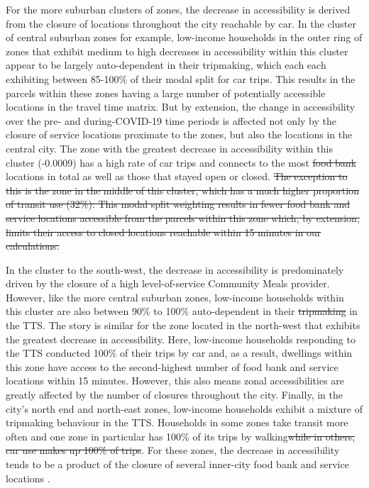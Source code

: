 \documentclass[]{elsarticle} %
\providecommand{\DIFaddtex}[1]{{\protect\color{blue}\uwave{#1}}} %
\providecommand{\DIFdeltex}[1]{{\protect\color{red}\sout{#1}}}                      %
\providecommand{\DIFaddbegin}{} %
\providecommand{\DIFaddend}{} %
\providecommand{\DIFdelbegin}{} %
\providecommand{\DIFdelend}{} %
\providecommand{\DIFadd}[1]{\texorpdfstring{\DIFaddtex{#1}}{#1}} %
\providecommand{\DIFdel}[1]{\texorpdfstring{\DIFdeltex{#1}}{}} %
\newcommand{\DIFscaledelfig}{0.5}
\newlength{\DIFdelgraphicswidth} %
\newlength{\DIFdelgraphicsheight} %
\newcommand{\DIFaddincludegraphics}[2][]{{\color{blue}\fbox{\DIFOincludegraphics[#1]{#2}}}} %
\newcommand{\DIFdelincludegraphics}[2][]{%
\sbox{\DIFdelgraphicsbox}{\DIFOincludegraphics[#1]{#2}}%
\settoboxwidth{\DIFdelgraphicswidth}{\DIFdelgraphicsbox} %
\settoboxtotalheight{\DIFdelgraphicsheight}{\DIFdelgraphicsbox} %
\scalebox{\DIFscaledelfig}{%
\parbox[b]{\DIFdelgraphicswidth}{\usebox{\DIFdelgraphicsbox}\\[-\baselineskip] \rule{\DIFdelgraphicswidth}{0em}}\llap{\resizebox{\DIFdelgraphicswidth}{\DIFdelgraphicsheight}{%
\setlength{\unitlength}{\DIFdelgraphicswidth}%
\begin{picture}(1,1)%
\thicklines\linethickness{2pt} %
{\color[rgb]{1,0,0}\put(0,0){\framebox(1,1){}}}%
{\color[rgb]{1,0,0}\put(0,0){\line( 1,1){1}}}%
{\color[rgb]{1,0,0}\put(0,1){\line(1,-1){1}}}%
\end{picture}%
}\hspace*{3pt}}} %
} %
\DeclareRobustCommand{\DIFaddbegin}{\DIFOaddbegin \let\includegraphics\DIFaddincludegraphics} %
\DeclareRobustCommand{\DIFaddend}{\DIFOaddend \let\includegraphics\DIFOincludegraphics} %
\DeclareRobustCommand{\DIFdelbegin}{\DIFOdelbegin \let\includegraphics\DIFdelincludegraphics} %
\DeclareRobustCommand{\DIFdelend}{\DIFOaddend \let\includegraphics\DIFOincludegraphics} %
\begin{document}
For the more suburban clusters of zones, the decrease in accessibility
is derived from the closure of locations throughout the city reachable
by car. In the cluster of central suburban zones for example, low-income
households in the outer ring of zones that exhibit medium to high
decreases in accessibility within this cluster appear to be largely
auto-dependent in their tripmaking, which each each exhibiting between
85-100\% of their modal split for car trips. This results in the parcels
within these zones having a large number of potentially accessible
locations in the travel time matrix. But by extension, the change in
accessibility over the pre- and during-COVID-19 time periods is affected
not only by the closure of service locations proximate to the zones, but
also the locations in the central city. The zone with the greatest
decrease in accessibility within this cluster (-0.0009) has a high rate
of car trips and connects to the most \DIFdelbegin \DIFdel{food bank }\DIFdelend \DIFaddbegin \DIFadd{facility }\DIFaddend locations in total as
well as those that stayed open or closed.
\DIFdelbegin \DIFdel{The exception to this is the
zone in the middle of this cluster, which has a much higher proportion
of transit use (32\%). This modal split weighting results in fewer food
bank and service locations accessible from the parcels within this zone
which, by extension, limits their access to closed locations reachable
within 15 minutes in our calculations.
}\DIFdelend 

In the cluster to the south-west, the decrease in accessibility is
predominately driven by the closure of a high level-of-service Community
Meals provider. However, like the more central suburban zones,
low-income households within this cluster are also between 90\% to 100\%
auto-dependent in their \DIFdelbegin \DIFdel{tripmaking }\DIFdelend \DIFaddbegin \DIFadd{trip-making }\DIFaddend in the TTS. The story is similar for
the zone located in the north-west that exhibits the greatest decrease
in accessibility. Here, low-income households responding to the TTS
conducted 100\% of their trips by car and, as a result, dwellings within
this zone have access to the second-highest number of food bank and
service locations within 15 minutes. However, this also means zonal
accessibilities are greatly affected by the number of closures
throughout the city. Finally, in the city's north end and north-east
zones, low-income households exhibit a mixture of tripmaking behaviour
in the TTS. Households in some zones take transit more often and one
zone in particular has 100\% of its trips by walking\DIFdelbegin \DIFdel{while in others,
car use makes up 100\% of trips}\DIFdelend . For these zones,
the decrease in accessibility tends to be a product of the closure of
several inner-city food bank and service locations \DIFaddbegin \DIFadd{reachable by multiple
modes}\DIFaddend .
\end{document}
